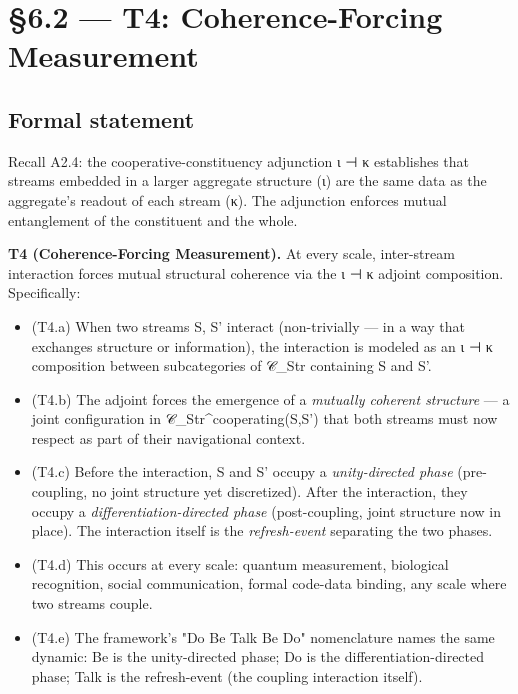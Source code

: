 \documentclass[11pt, openany]{book}
\newcommand{\sectionbreak}{\clearpage}
\begin{document}
\sectionbreak

\section{§6.2 --- T4: Coherence-Forcing Measurement}

\subsection{Formal statement}

Recall A2.4: the cooperative-constituency adjunction ι ⊣ κ establishes that streams embedded in a larger aggregate structure (ι) are the same data as the aggregate's readout of each stream (κ). The adjunction enforces mutual entanglement of the constituent and the whole.

\textbf{T4 (Coherence-Forcing Measurement).} At every scale, inter-stream interaction forces mutual structural coherence via the ι ⊣ κ adjoint composition. Specifically:

\begin{itemize}
\item (T4.a) When two streams S, S' interact (non-trivially --- in a way that exchanges structure or information), the interaction is modeled as an ι ⊣ κ composition between subcategories of 𝒞\_\allowbreak{}Str containing S and S'.
\item (T4.b) The adjoint forces the emergence of a \textit{mutually coherent structure} --- a joint configuration in 𝒞\_\allowbreak{}Str\textasciicircum{}{cooperating(S,S')} that both streams must now respect as part of their navigational context.
\item (T4.c) Before the interaction, S and S' occupy a \textit{unity-directed phase} (pre-coupling, no joint structure yet discretized). After the interaction, they occupy a \textit{differentiation-directed phase} (post-coupling, joint structure now in place). The interaction itself is the \textit{refresh-event} separating the two phases.
\item (T4.d) This occurs at every scale: quantum measurement, biological recognition, social communication, formal code-data binding, any scale where two streams couple.
\item (T4.e) The framework's "Do Be Talk Be Do" nomenclature names the same dynamic: Be is the unity-directed phase; Do is the differentiation-directed phase; Talk is the refresh-event (the coupling interaction itself).
\end{itemize}
\end{document}
